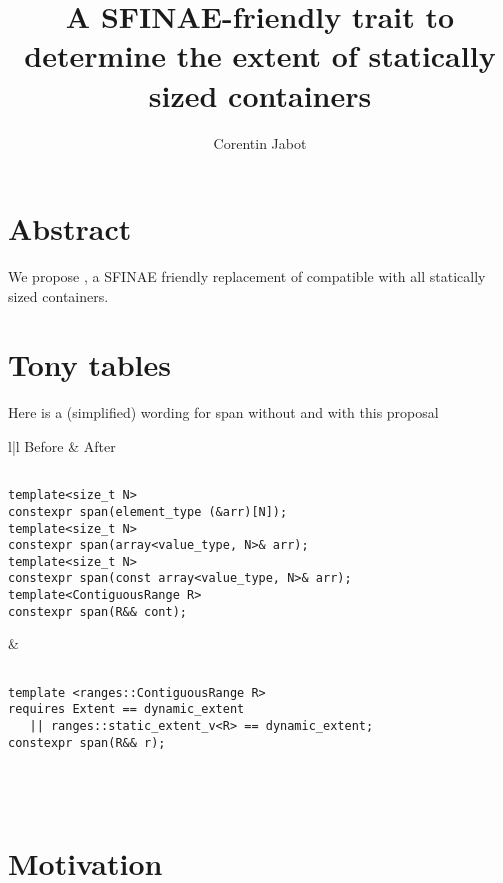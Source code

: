 \documentclass{wg21}
\title{A SFINAE-friendly trait to determine the extent of statically sized containers}
\author{Corentin Jabot}{corentin.jabot@gmail.com}
\begin{document}
\maketitle

\section{Abstract}

We propose , a SFINAE friendly replacement of  compatible with all statically sized containers.

\section{Tony tables}

Here is a (simplified) wording for span without and with this proposal

\begin{center}
\begin{tabular}{l|l}
Before & After\\ \hline

\begin{minipage}[t]{0.5\textwidth}

\begin{verbatim}

template<size_t N>
constexpr span(element_type (&arr)[N]);
template<size_t N>
constexpr span(array<value_type, N>& arr);
template<size_t N>
constexpr span(const array<value_type, N>& arr);
template<ContiguousRange R>
constexpr span(R&& cont);
\end{verbatim}
\end{minipage}
&
\begin{minipage}[t]{0.5\textwidth}
\begin{verbatim}

template <ranges::ContiguousRange R>
requires Extent == dynamic_extent 
   || ranges::static_extent_v<R> == dynamic_extent;
constexpr span(R&& r);
\end{verbatim}
\end{minipage}
\\\\ \hline

\end{tabular}
\end{center}


\section{Motivation}
\end{document}
